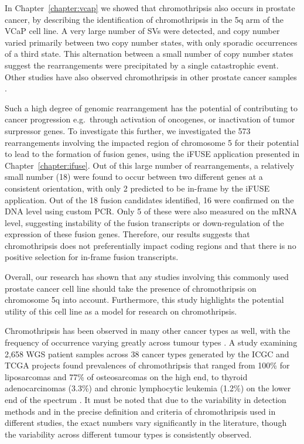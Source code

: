 In Chapter~\ref{chapter:vcap} we showed that chromothripsis also occurs in prostate cancer, by describing the identification of chromothripsis in the 5q arm of the VCaP cell line. A very large number of SVs were detected, and copy number varied primarily between two copy number states, with only sporadic occurrences of a third state. This alternation between a small number of copy number states suggest the rearrangements were precipitated by a single catastrophic event.
Other studies have also observed chromothripsis in other prostate cancer samples \cite{wu2012poly,Baca2013}.

Such a high degree of genomic rearrangement has the potential of contributing to cancer progression e.g.\ through activation of oncogenes, or inactivation of tumor surpressor genes.
To investigate this further, we investigated the 573 rearrangements involving the impacted region of chromosome 5 for their potential to lead to the formation of fusion genes, using the iFUSE application presented in Chapter~\ref{chapter:ifuse}.
Out of this large number of rearrangements, a relatively small number (18) were found to occur between two different genes at a consistent orientation, with only 2 predicted to be in-frame by the iFUSE application.
Out of the 18 fusion candidates identified, 16 were confirmed on the DNA level using custom PCR\@.
Only 5 of these were also measured on the mRNA level, suggesting instability of the fusion transcripts or down-regulation of the expression of these fusion genes.
Therefore, our results suggests that chromothripsis does not preferentially impact coding regions and that there is no positive selection for in-frame fusion transcripts.

Overall, our research has shown that any studies involving this commonly used prostate cancer cell line should take the presence of chromothripsis on chromosome 5q into account.
Furthermore, this study highlights the potential utility of this cell line as a model for research on chromothripsis.

Chromothripsis has been observed in many other cancer types as well, with the frequency of occurrence varying greatly across tumour types \cite{cortes2020comprehensive,voronina2020landscape,Koltsova2019,kloosterman2014prevalence}.
A study examining 2,658 WGS patient samples across 38 cancer types generated by the ICGC and TCGA projects found prevalences of chromothripsis that ranged from 100\% for liposarcomas and 77\% of osteosarcomas on the high end, to thyroid adenocarcinomas (3.3\%) and chronic lymphocytic leukemia (1.2\%) on the lower end of the spectrum \cite{cortes2020comprehensive}.
It must be noted that due to the variability in detection methods and in the precise definition and criteria of chromothripsis used in different studies, the exact numbers vary significantly in the literature, though the variability across different tumour types is consistently observed.

